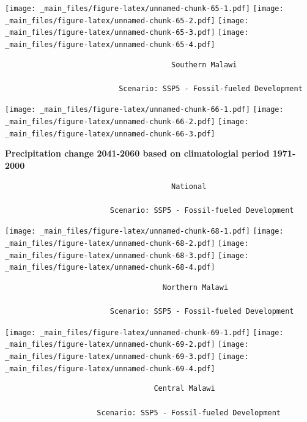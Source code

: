 \documentclass[
]{book}
\begin{document}
\texttt{[image: \_main\_files/figure-latex/unnamed-chunk-65-1.pdf]} \texttt{[image: \_main\_files/figure-latex/unnamed-chunk-65-2.pdf]} \texttt{[image: \_main\_files/figure-latex/unnamed-chunk-65-3.pdf]} \texttt{[image: \_main\_files/figure-latex/unnamed-chunk-65-4.pdf]}

\begin{verbatim}
                                      Southern Malawi
                                      
                          Scenario: SSP5 - Fossil-fueled Development
\end{verbatim}

\texttt{[image: \_main\_files/figure-latex/unnamed-chunk-66-1.pdf]} \texttt{[image: \_main\_files/figure-latex/unnamed-chunk-66-2.pdf]} \texttt{[image: \_main\_files/figure-latex/unnamed-chunk-66-3.pdf]}

\textbf{Precipitation change 2041-2060 based on climatologial period 1971-2000}

\begin{verbatim}
                                      National
                                    
                        Scenario: SSP5 - Fossil-fueled Development
\end{verbatim}

\texttt{[image: \_main\_files/figure-latex/unnamed-chunk-68-1.pdf]} \texttt{[image: \_main\_files/figure-latex/unnamed-chunk-68-2.pdf]} \texttt{[image: \_main\_files/figure-latex/unnamed-chunk-68-3.pdf]} \texttt{[image: \_main\_files/figure-latex/unnamed-chunk-68-4.pdf]}

\begin{verbatim}
                                    Northern Malawi
                                    
                        Scenario: SSP5 - Fossil-fueled Development      
\end{verbatim}

\texttt{[image: \_main\_files/figure-latex/unnamed-chunk-69-1.pdf]} \texttt{[image: \_main\_files/figure-latex/unnamed-chunk-69-2.pdf]} \texttt{[image: \_main\_files/figure-latex/unnamed-chunk-69-3.pdf]} \texttt{[image: \_main\_files/figure-latex/unnamed-chunk-69-4.pdf]}

\begin{verbatim}
                                  Central Malawi
                                  
                     Scenario: SSP5 - Fossil-fueled Development
\end{verbatim}
\end{document}
